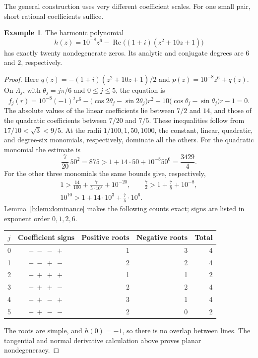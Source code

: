 \documentclass[UTF8,11pt]{ctexart}
\theoremstyle{definition}
\newtheorem{eg}[thm]{Example}
\numberwithin{equation}{section}
\DeclareMathOperator{\Rea}{Re}\DeclareMathOperator{\Ima}{Im}
\begin{document}
The general construction uses very different coefficient scales.
For one small pair, short rational coefficients suffice.
\begin{eg}\label{b:eg:harmonictwenty}
The harmonic polynomial
\[
 h(z)=10^{-8}z^6-\Rea\bigl((1+i)(z^2+10z+1)\bigr)
\]
has exactly twenty nondegenerate zeros. Its analytic and conjugate
degrees are $6$ and $2$, respectively.
\end{eg}
\begin{proof}
Here $q(z)=-(1+i)(z^2+10z+1)/2$ and
$p(z)=10^{-8}z^6+q(z)$. On $\Lambda_j$, with
$\theta_j=j\pi/6$ and $0\le j\le5$, the equation is
\[
 f_j(r)=10^{-8}(-1)^jr^6
 -\bigl(\cos2\theta_j-\sin2\theta_j\bigr)r^2
 -10\bigl(\cos\theta_j-\sin\theta_j\bigr)r-1=0.
\]
The absolute values of the linear coefficients lie between $7/2$
and $14$, and those of the quadratic coefficients between $7/20$
and $7/5$. These inequalities follow from
$17/10<\sqrt3<9/5$.
At the radii $1/100,1,50,1000$, the constant, linear, quadratic,
and degree-six monomials, respectively, dominate all the others.
For the quadratic monomial the estimate is
\[
 \frac7{20}\,50^2=875>
 1+14\cdot50+10^{-8}50^6=\frac{3429}{4}.
\]
For the other three monomials the same bounds give, respectively,
\[
 \begin{gathered}
 1>\frac{14}{100}+\frac{7}{5\cdot10^4}+10^{-20},\qquad
 \frac72>1+\frac75+10^{-8},\\
 10^{10}>1+14\cdot10^3+\frac75\cdot10^6.
 \end{gathered}
\]
Lemma~\ref{b:lem:dominance} makes the following counts exact; signs
are listed in exponent order $0,1,2,6$.
\begin{center}
\begin{tabular}{ccrrr}
\toprule
$j$ & Coefficient signs & Positive roots & Negative roots & Total\\
\midrule
0 & $-\ -\ -\ +$ & 1 & 3 & 4\\
1 & $-\ -\ +\ -$ & 2 & 2 & 4\\
2 & $-\ +\ +\ +$ & 1 & 1 & 2\\
3 & $-\ +\ +\ -$ & 2 & 2 & 4\\
4 & $-\ +\ -\ +$ & 3 & 1 & 4\\
5 & $-\ +\ -\ -$ & 2 & 0 & 2\\
\bottomrule
\end{tabular}
\end{center}
The roots are simple, and $h(0)=-1$, so there is no overlap between
lines. The tangential and normal derivative calculation above
proves planar nondegeneracy.
\end{proof}
\end{document}
